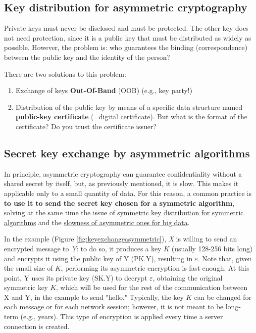 \subsection{Key distribution for asymmetric cryptography}
Private keys must never be disclosed and must be protected. The other key does not need protection, since it is a public key that must be distributed as widely as possible. However, the problem is: who guarantees the binding (correspondence) between the public key and the identity of the person?

There are two solutions to this problem:
\begin{enumerate}
    \item Exchange of keys \textbf{Out-Of-Band} (OOB) (e.g., key party!)
    \item Distribution of the public key by means of a specific data structure named \textbf{public-key certificate} (=digital certificate).
          But what is the format of the certificate? Do you trust the certificate issuer?
\end{enumerate}


\subsection{Secret key exchange by asymmetric algorithms}\label{chap:keyexchangeasymmetric}
In principle, asymmetric cryptography can guarantee confidentiality without a shared secret by itself, but, as previously mentioned, it is slow. This makes it applicable only to a small quantity of data. For this reason, a common practice is \textbf{to use it to send the secret key chosen for a symmetric algorithm}, solving at the same time the issue of \ul{symmetric key distribution for symmetric algorithms} and the \ul{slowness of asymmetric ones for big data}.

In the example (Figure \ref*{fig:keyexchangeasymmetric}), \textit{X} is willing to send an encrypted message to \textit{Y}: to do so, it produces a key \(K\) (usually 128-256 bits long) and encrypts it using the public key of Y (\(\text{PK.Y}\)), resulting in \(\varepsilon\). Note that, given the small size of \(K\), performing its asymmetric encryption is fast enough. At this point, Y uses its private key (\(\text{SK.Y}\)) to decrypt \(\varepsilon\), obtaining the original symmetric key \(K\), which will be used for the rest of the communication between X and Y, in the example to send "hello." Typically, the key \(K\) can be changed for each message or for each network session; however, it is not meant to be long-term (e.g., years). This type of encryption is applied every time a server connection is created.

